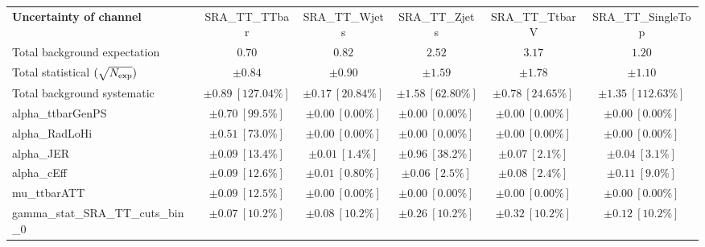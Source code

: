 
\begin{sidewaystable}
\begin{center}
\setlength{\tabcolsep}{0.0pc}
\begin{tabular*}{\textwidth}{@{\extracolsep{\fill}}lccccc}
\noalign{\smallskip}\hline\noalign{\smallskip}
{\bf Uncertainty of channel}                                    & SRA\_TT\_TTbar            & SRA\_TT\_Wjets            & SRA\_TT\_Zjets            & SRA\_TT\_TtbarV            & SRA\_TT\_SingleTop            \\
\noalign{\smallskip}\hline\noalign{\smallskip}
Total background expectation             &  $0.70$        &  $0.82$        &  $2.52$        &  $3.17$        &  $1.20$       \\
\noalign{\smallskip}\hline\noalign{\smallskip}
Total statistical $(\sqrt{N_{\rm exp}})$              & $\pm 0.84$        & $\pm 0.90$        & $\pm 1.59$        & $\pm 1.78$        & $\pm 1.10$       \\
Total background systematic               & $\pm 0.89\ [127.04\%] $        & $\pm 0.17\ [20.84\%] $        & $\pm 1.58\ [62.80\%] $        & $\pm 0.78\ [24.65\%] $        & $\pm 1.35\ [112.63\%] $             \\
\noalign{\smallskip}\hline\noalign{\smallskip}
\noalign{\smallskip}\hline\noalign{\smallskip}
alpha\_ttbarGenPS         & $\pm 0.70\ [99.5\%] $          & $\pm 0.00\ [0.00\%] $          & $\pm 0.00\ [0.00\%] $          & $\pm 0.00\ [0.00\%] $          & $\pm 0.00\ [0.00\%] $       \\
alpha\_RadLoHi         & $\pm 0.51\ [73.0\%] $          & $\pm 0.00\ [0.00\%] $          & $\pm 0.00\ [0.00\%] $          & $\pm 0.00\ [0.00\%] $          & $\pm 0.00\ [0.00\%] $       \\
alpha\_JER         & $\pm 0.09\ [13.4\%] $          & $\pm 0.01\ [1.4\%] $          & $\pm 0.96\ [38.2\%] $          & $\pm 0.07\ [2.1\%] $          & $\pm 0.04\ [3.1\%] $       \\
alpha\_cEff         & $\pm 0.09\ [12.6\%] $          & $\pm 0.01\ [0.80\%] $          & $\pm 0.06\ [2.5\%] $          & $\pm 0.08\ [2.4\%] $          & $\pm 0.11\ [9.0\%] $       \\
mu\_ttbarATT         & $\pm 0.09\ [12.5\%] $          & $\pm 0.00\ [0.00\%] $          & $\pm 0.00\ [0.00\%] $          & $\pm 0.00\ [0.00\%] $          & $\pm 0.00\ [0.00\%] $       \\
gamma\_stat\_SRA\_TT\_cuts\_bin\_0         & $\pm 0.07\ [10.2\%] $          & $\pm 0.08\ [10.2\%] $          & $\pm 0.26\ [10.2\%] $          & $\pm 0.32\ [10.2\%] $          & $\pm 0.12\ [10.2\%] $       \\

\end{tabular*}
\end{center}
\end{sidewaystable}

